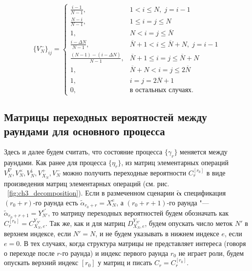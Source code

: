 \begin{equation}\label{eq:ch3_fg_tag_departure}
	\{ V_N^- \}_{ij} = \begin{cases}
 		\frac{i-1}{N-1}, & 1 < i \leqslant N,\; j = i - 1\\
 		\frac{N-i}{N-1}, & 1 \leqslant i = j \leqslant N\\
 		1,               & N < i = j \leqslant \overline{N}\\
 		\frac{i - \Delta N}{N - 1},            & \overline{N} + 1 < i \leqslant \overline{N} + N,\; j = i - 1\\
 		\frac{(N-1) - (i - \Delta N)}{N - 1},  & \overline{N} + 1 \leqslant i = j \leqslant \overline{N} + N\\
 		1,               & \overline{N} + N < i = j \leqslant 2\overline{N}\\
 		1,               & i = j = 2\overline{N}+1\\
 		0,               & \text{в остальных случаях}.
 	\end{cases}
\end{equation}





\subsection{Матрицы переходных вероятностей между раундами для основного процесса}
Здесь и далее будем считать, что состояние процесса $\{ \gamma_r \}$ меняется между раундами. Как ранее для процесса $\{ \eta_r \}$, из матриц элементарных операций $V_N^\nabla, V_N^\times, V_N^\downarrow, V_{X_N}^+, V_N^-$ можно получить переходные вероятности $C_r^{[r_0]}$ в виде произведения матриц элементарных операций (см. рис. ~\ref{fig:ch3_decomposition}). Если в размеченном сценарии $\widetilde{\bm{\alpha}}$ спецификация $(r_0 + r)$-го раунда есть $\widetilde{\alpha}_{r_0 + r} = X_{N}^e$, а $(r_0+r+1)$-го раунда "--- $\widetilde{\alpha}_{r_0+r+1} = Y_{N'}^{e'}$, то матрицу переходных вероятностей будем обозначать как $C_r^{[r_0]} = C_{X_N,e}^{Y_{N'}}$. Так же, как и для матриц $D_{X_{N},e}^{Y_{N'}}$, будем опускать число меток $N'$ в верхнем индексе, если $N' = N$, и не будем указывать в нижнем индексе $e$, если $e = 0$. В тех случаях, когда структура матрицы не представляет интереса (говоря о переходе после $r$-го раунда) и индекс первого раунда $r_0$ не играет роли, будем опускать верхний индекс $[r_0]$ у матриц и писать $C_r = C_r^{[r_0]}$.

